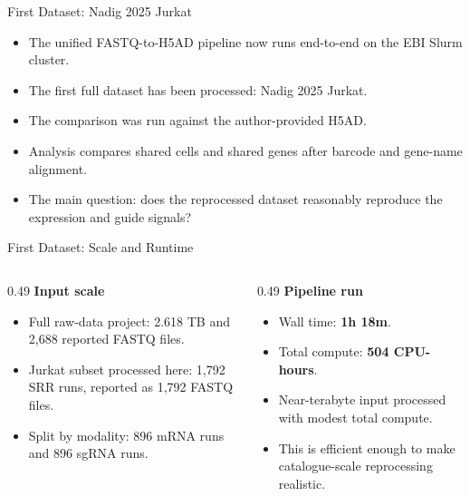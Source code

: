 \documentclass[handout,aspectratio=169]{beamer}
\begin{document}
\begin{frame}{First Dataset: Nadig 2025 Jurkat}
    \begin{itemize}
        \item The unified FASTQ-to-H5AD pipeline now runs end-to-end on the EBI Slurm cluster.
        \item The first full dataset has been processed: Nadig 2025 Jurkat.
        \item The comparison was run against the author-provided H5AD.
        \item Analysis compares shared cells and shared genes after barcode and gene-name alignment.
        \item The main question: does the reprocessed dataset reasonably reproduce the expression and guide signals?
    \end{itemize}
\end{frame}

\begin{frame}{First Dataset: Scale and Runtime}
    \begin{columns}[T,onlytextwidth]
        \begin{column}{0.49\textwidth}
            \textbf{Input scale}
            \vspace{0.5em}
            \begin{itemize}
                \item Full raw-data project: 2.618 TB and 2,688 reported FASTQ files.
                \item Jurkat subset processed here: 1,792 SRR runs, reported as 1,792 FASTQ files.
                \item Split by modality: 896 mRNA runs and 896 sgRNA runs.
            \end{itemize}
        \end{column}
        \begin{column}{0.49\textwidth}
            \textbf{Pipeline run}
            \vspace{0.5em}
            \begin{itemize}
                \item Wall time: \textbf{1h 18m}.
                \item Total compute: \textbf{504 CPU-hours}.
                \item Near-terabyte input processed with modest total compute.
                \item This is efficient enough to make catalogue-scale reprocessing realistic.
            \end{itemize}
        \end{column}
    \end{columns}
\end{frame}
\end{document}
